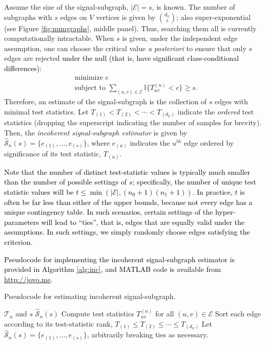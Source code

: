 \documentclass[10pt,journal,cspaper,compsoc]{IEEEtran}
\providecommand{\tk}[1]{\textcolor{black}{#1}}
\newcommand{\II}{\mathbb{I}}           %
\providecommand{\mc}[1]{\mathcal{#1}}
\providecommand{\mhc}[1]{\widehat{\mathcal{#1}}}
\begin{document}
Assume the size of the signal-subgraph, $|\mc{E}|=s$, is known.  The number of subgraphs with $s$ edges on $V$ vertices is given by $\binom{d_V}{s}$; also super-exponential (see Figure \ref{fig:numgraphs}, middle panel). Thus, searching them all is currently computationally intractable.  When $s$ is given, under the  independent edge assumption, one can choose the critical value \emph{a posteriori} to ensure that only $s$ edges are rejected \tk{under the null (that is, have significant class-conditional differences)}:
\begin{align}
	&\text{minimize } c \nonumber \\ &\text{subject to } \sum_{(u,v) \in \mc{E}} \II \{T_{uv}^{(n)} < c\} \geq s.
\end{align}
Therefore, an estimate of the signal-subgraph is the collection of $s$ edges with minimal test statistics.  Let $T_{(1)} < T_{(2)} < \cdots < T_{(d_V)}$ indicate the \emph{ordered} test statistics (dropping the superscript indicating the number of samples for brevity).  Then, the \emph{incoherent signal-subgraph estimator} is given by $\mhc{S}_n(s)=\{e_{(1)}, \ldots, e_{(s)}\}$, where $e_{(u)}$ indicates the $u^{th}$ edge ordered by significance of its test statistic, $T_{(u)}$.  %


\tk{Note that the number of distinct test-statistic values is typically much smaller than the number of possible settings of $s$; specifically, the number of unique test statistic values will be $t \leq \min(|\mc{E}|,(n_0+1) (n_1+1))$.  In practice, $t$ is often be far less than either of the upper bounds, because not every edge has a unique contingency table. In such scenarios, certain settings of the hyper-parameters will lead to ``ties'', that is, edges that are equally valid under the assumptions.  In such settings, we simply randomly choose edges satisfying the criterion.}



\tk{Pseudocode for implementing the incoherent signal-subgraph estimator is provided in Algorithm \ref{alg:inc}, and MATLAB code is available from \url{http://jovo.me}.}

\begin{algorithm}
\caption{Pseudocode for estimating incoherent signal-subgraph.}
\label{alg:inc}
\begin{algorithmic}[1]
\REQUIRE $\mc{T}_n$ and $s$
\ENSURE $\mhc{S}_n(s)$
\STATE Compute test statistics $T_{uv}^{(n)}$ for all $(u,v) \in \mc{E}$
\STATE Sort each edge according to its test-statistic rank, $T_{(1)} \leq T_{(2)} \leq \cdots \leq T_{(d_V)}$
\STATE Let $\mhc{S}_n(s)=\{e_{(1)}, \ldots, e_{(s)}\}$, arbitrarily breaking ties as necessary.
\end{algorithmic}
\end{algorithm}
\end{document}
